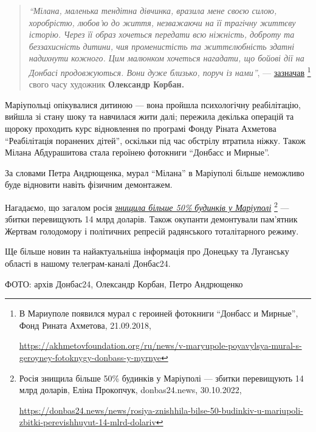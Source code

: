 \begin{quote}
\emph{\enquote{Мілана, маленька тендітна дівчинка, вразила мене своєю силою, хоробрістю,
любов'ю до життя, незважаючи на її трагічну життєву історію. Через її образ
хочеться передати всю ніжність, доброту та беззахисність дитини, чия
променистість та життєлюбність здатні надихнути кожного. Цим малюнком хочеться
нагадати, що бойові дії на Донбасі продовжуються. Вони дуже близько, поруч із
нами}}, — \href{https://akhmetovfoundation.org/ru/news/v-maryupole-poyavylsya-mural-s-geroyney-fotoknygy-donbass-y-myrnye}{зазначав} 
\footnote{В Мариуполе появился мурал с героиней фотокниги \enquote{Донбасс и Мирные}, Фонд Рината Ахметова, 21.09.2018, \par\url{https://akhmetovfoundation.org/ru/news/v-maryupole-poyavylsya-mural-s-geroyney-fotoknygy-donbass-y-myrnye}} 
свого часу художник \textbf{Олександр Корбан.}
\end{quote}

Маріупольці опікувалися дитиною — вона пройшла психологічну реабілітацію,
вийшла зі стану шоку та навчилася жити далі; пережила декілька операцій та
щороку проходить курс відновлення по програмі Фонду Ріната Ахметова
\enquote{Реабілітація поранених дітей}, оскільки під час обстрілу втратила ніжку. Також
Мілана Абдурашитова стала героїнею фотокниги \enquote{Донбасс и Мирные}.

За словами Петра Андрющенка, мурал \enquote{Мілана} в Маріуполі більше неможливо буде
відновити навіть фізичним демонтажем.


Нагадаємо, що загалом росія \href{https://donbas24.news/news/rosiya-znishhila-bilse-50-budinkiv-u-mariupoli-zbitki-perevishhuyut-14-mlrd-dolariv}{\emph{знищила більше 50\% будинків у Маріуполі}}%
\footnote{Росія знищила більше 50\% будинків у Маріуполі — збитки перевищують 14 млрд доларів, Еліна Прокопчук, donbas24.news, 30.10.2022, \par\url{https://donbas24.news/news/rosiya-znishhila-bilse-50-budinkiv-u-mariupoli-zbitki-perevishhuyut-14-mlrd-dolariv}}
— збитки перевищують 14 млрд доларів. Також окупанти демонтували пам'ятник
Жертвам голодомору і політичних репресій радянського тоталітарного режиму.


Ще більше новин та найактуальніша інформація про Донецьку та Луганську області
в нашому телеграм-каналі Донбас24.

ФОТО: архів Донбас24, Олександр Корбан, Петро Андрющенко

